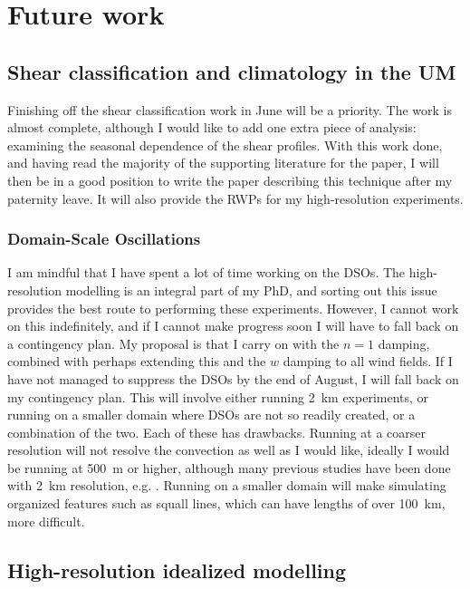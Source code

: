 \documentclass[11pt,a4paper]{article}
\begin{document}
\section{Future work}
\label{sec:Future work}

\subsection{Shear classification and climatology in the UM}
\label{sec:Shear climatology in the UM}

Finishing off the shear classification work in June will be a priority. The work is almost complete, although I would like to add one extra piece of analysis: examining the seasonal dependence of the shear profiles. With this work done, and having read the majority of the supporting literature for the paper, I will then be in a good position to write the paper describing this technique after my paternity leave. It will also provide the RWPs for my high-resolution experiments.

\subsubsection{Domain-Scale Oscillations}
\label{sec:dso_future}
I am mindful that I have spent a lot of time working on the DSOs. The high-resolution modelling is an integral part of my PhD, and sorting out this issue provides the best route to performing these experiments. However, I cannot work on this indefinitely, and if I cannot make progress soon I will have to fall back on a contingency plan. My proposal is that I carry on with the $n = 1$ damping, combined with perhaps extending this and the $w$ damping to all wind fields. If I have not managed to suppress the DSOs by the end of August, I will fall back on my contingency plan. This will involve either running \SI{2}{km} experiments, or running on a smaller domain where DSOs are not so readily created, or a combination of the two. Each of these has drawbacks. Running at a coarser resolution will not resolve the convection as well as I would like, ideally I would be running at \SI{500}{m} or higher, although many previous studies have been done with \SI{2}{km} resolution, e.g. \cite{tompkins2017organization}. Running on a smaller domain will make simulating organized features such as squall lines, which can have lengths of over \SI{100}{km}, more difficult.

\subsection{High-resolution idealized modelling}
\label{sec:High-resolution idealized modelling}
\end{document}
